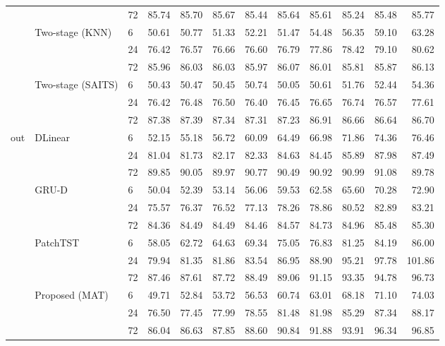 \begin{table}
\begin{tabular}{lllrrrrrrrrr}
 &  & 72 & 85.74 & 85.70 & 85.67 & 85.44 & 85.64 & 85.61 & 85.24 & 85.48 & 85.77 \\
\cline{2-12}
 & \multirow[t]{3}{*}{Two-stage (KNN)} & 6 & 50.61 & 50.77 & 51.33 & 52.21 & 51.47 & 54.48 & 56.35 & 59.10 & 63.28 \\
 &  & 24 & 76.42 & 76.57 & 76.66 & 76.60 & 76.79 & 77.86 & 78.42 & 79.10 & 80.62 \\
 &  & 72 & 85.96 & 86.03 & 86.03 & 85.97 & 86.07 & 86.01 & 85.81 & 85.87 & 86.13 \\
\cline{2-12}
 & \multirow[t]{3}{*}{Two-stage (SAITS)} & 6 & 50.43 & 50.47 & 50.45 & 50.74 & 50.05 & 50.61 & 51.76 & 52.44 & 54.36 \\
 &  & 24 & 76.42 & 76.48 & 76.50 & 76.40 & 76.45 & 76.65 & 76.74 & 76.57 & 77.61 \\
 &  & 72 & 87.38 & 87.39 & 87.34 & 87.31 & 87.23 & 86.91 & 86.66 & 86.64 & 86.70 \\
\cline{1-12} \cline{2-12}
\multirow[t]{21}{*}{out} & \multirow[t]{3}{*}{DLinear} & 6 & 52.15 & 55.18 & 56.72 & 60.09 & 64.49 & 66.98 & 71.86 & 74.36 & 76.46 \\
 &  & 24 & 81.04 & 81.73 & 82.17 & 82.33 & 84.63 & 84.45 & 85.89 & 87.98 & 87.49 \\
 &  & 72 & 89.85 & 90.05 & 89.97 & 90.77 & 90.49 & 90.92 & 90.99 & 91.08 & 89.78 \\
\cline{2-12}
 & \multirow[t]{3}{*}{GRU-D} & 6 & 50.04 & 52.39 & 53.14 & 56.06 & 59.53 & 62.58 & 65.60 & 70.28 & 72.90 \\
 &  & 24 & 75.57 & 76.37 & 76.52 & 77.13 & 78.26 & 78.86 & 80.52 & 82.89 & 83.21 \\
 &  & 72 & 84.36 & 84.49 & 84.49 & 84.46 & 84.57 & 84.73 & 84.96 & 85.48 & 85.30 \\
\cline{2-12}
 & \multirow[t]{3}{*}{PatchTST} & 6 & 58.05 & 62.72 & 64.63 & 69.34 & 75.05 & 76.83 & 81.25 & 84.19 & 86.00 \\
 &  & 24 & 79.94 & 81.35 & 81.86 & 83.54 & 86.95 & 88.90 & 95.21 & 97.78 & 101.86 \\
 &  & 72 & 87.46 & 87.61 & 87.72 & 88.49 & 89.06 & 91.15 & 93.35 & 94.78 & 96.73 \\
\cline{2-12}
 & \multirow[t]{3}{*}{Proposed (MAT)} & 6 & 49.71 & 52.84 & 53.72 & 56.53 & 60.74 & 63.01 & 68.18 & 71.10 & 74.03 \\
 &  & 24 & 76.50 & 77.45 & 77.99 & 78.55 & 81.48 & 81.98 & 85.29 & 87.34 & 88.17 \\
 &  & 72 & 86.04 & 86.63 & 87.85 & 88.60 & 90.84 & 91.88 & 93.91 & 96.34 & 96.85 \\

\end{tabular}
\end{table}
